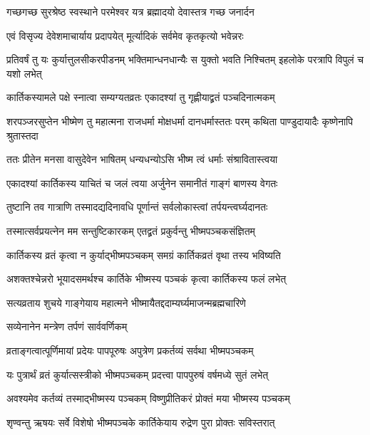 \twolineshloka
{गच्छगच्छ सुरश्रेष्ठ स्वस्थाने परमेश्वर}
{यत्र ब्रह्मादयो देवास्तत्र गच्छ जनार्दन} %

\twolineshloka
{एवं विसृज्य देवेशमाचार्याय प्रदापयेत्}
{मूर्त्यादिकं सर्वमेव कृतकृत्यो भवेन्नरः} %

\threelineshloka
{प्रतिवर्षं तु यः कुर्यात्तुलसीकरपीडनम्}
{भक्तिमान्धनधान्यैः स युक्तो भवति निश्चितम्}
{इहलोके परत्रापि विपुलं च यशो लभेत्} %





\twolineshloka
{कार्तिकस्यामले पक्षे स्नात्वा सम्यग्यतव्रतः}
{एकादश्यां तु गृह्णीयाद्व्रतं पञ्चदिनात्मकम्} %

\threelineshloka
{शरपञ्जरसुप्तेन भीष्मेण तु महात्मना}
{राजधर्मा मोक्षधर्मा दानधर्मास्ततः परम्}
{कथिता पाण्डुदायादैः कृष्णेनापि श्रुतास्तदा} %

\twolineshloka
{ततः प्रीतेन मनसा वासुदेवेन भाषितम्}
{धन्यधन्योऽसि भीष्म त्वं धर्माः संश्रावितास्त्वया} %

\twolineshloka
{एकादश्यां कार्तिकस्य याचितं च जलं त्वया}
{अर्जुनेन समानीतं गाङ्गं बाणस्य वेगतः} %

\twolineshloka
{तुष्टानि तव गात्राणि तस्मादद्यदिनावधि}
{पूर्णान्तं सर्वलोकास्त्वां तर्पयन्त्वर्घ्यदानतः} %

\twolineshloka
{तस्मात्सर्वप्रयत्नेन मम सन्तुष्टिकारकम्}
{एतद्व्रतं प्रकुर्वन्तु भीष्मपञ्चकसंज्ञितम्} %

\twolineshloka
{कार्तिकस्य व्रतं कृत्वा न कुर्याद्भीष्मपञ्चकम्}
{समग्रं कार्तिकव्रतं वृथा तस्य भविष्यति} %

\twolineshloka
{अशक्तश्चेन्नरो भूयादसमर्थश्च कार्तिके}
{भीष्मस्य पञ्चकं कृत्वा कार्तिकस्य फलं लभेत्} %

\twolineshloka
{सत्यव्रताय शुचये गाङ्गेयाय महात्मने}
{भीष्मायैतद्ददाम्यर्घ्यमाजन्मब्रह्मचारिणे} %


\onelineshloka
{सव्येनानेन मन्त्रेण तर्पणं सार्ववर्णिकम्} %

\twolineshloka
{व्रताङ्गत्वात्पूर्णिमायां प्रदेयः पापपूरुषः}
{अपुत्रेण प्रकर्तव्यं सर्वथा भीष्मपञ्चकम्} %

\twolineshloka
{यः पुत्रार्थं व्रतं कुर्यात्सस्त्रीको भीष्मपञ्चकम्}
{प्रदत्त्वा पापपुरुषं वर्षमध्ये सुतं लभेत्} %

\twolineshloka
{अवश्यमेव कर्तव्यं तस्माद्भीष्मस्य पञ्चकम्}
{विष्णुप्रीतिकरं प्रोक्तं मया भीष्मस्य पञ्चकम्} %


\twolineshloka
{शृण्वन्तु ऋषयः सर्वे विशेषो भीष्मपञ्चके}
{कार्तिकेयाय रुद्रेण पुरा प्रोक्तः सविस्तरात्} %



